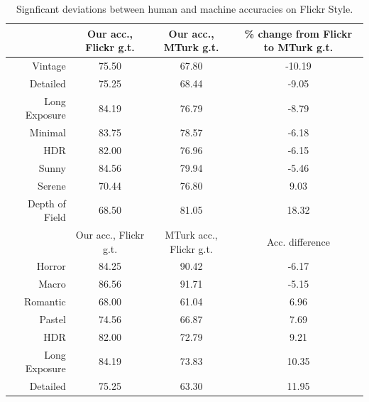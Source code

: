 \begin{table}[ht!]
\caption{Signficant deviations between human and machine accuracies on Flickr Style.}\label{tab:flickr_vs_mturk2}
\centering
\small{
\begin{tabular}{rccc}
\toprule
{}                    & Our acc., Flickr g.t.   & Our acc., MTurk g.t.  & \% change from Flickr to MTurk g.t. \\
\midrule
Vintage               & 75.50                       & 67.80                     & -10.19 \\
Detailed              & 75.25                       & 68.44                     & -9.05 \\
Long Exposure         & 84.19                       & 76.79                     & -8.79 \\
Minimal               & 83.75                       & 78.57                     & -6.18 \\
HDR                   & 82.00                       & 76.96                     & -6.15 \\
Sunny                 & 84.56                       & 79.94                     & -5.46 \\
Serene                & 70.44                       & 76.80                     & 9.03 \\
Depth of Field        & 68.50                       & 81.05                     & 18.32 \\
\toprule
{}                     & Our acc., Flickr g.t. & MTurk acc., Flickr g.t. & Acc. difference \\
\midrule
Horror                 & 84.25                     & 90.42                       & -6.17 \\
Macro                  & 86.56                     & 91.71                       & -5.15 \\
Romantic               & 68.00                     & 61.04                       & 6.96 \\
Pastel                 & 74.56                     & 66.87                       & 7.69 \\
HDR                    & 82.00                     & 72.79                       & 9.21 \\
Long Exposure          & 84.19                     & 73.83                       & 10.35 \\
Detailed               & 75.25                     & 63.30                       & 11.95 \\
\end{tabular}
}
\end{table}

